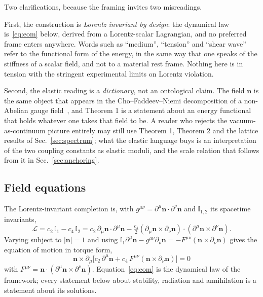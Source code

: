\documentclass[aps,prd,preprint,nofootinbib,longbibliography]{revtex4-2}
\newcommand{\nv}{\bm{n}}
\begin{document}
Two clarifications, because the framing invites two misreadings.

First, the construction is \emph{Lorentz invariant by design}: the dynamical law
is~\eqref{eq:eom} below, derived from a Lorentz-scalar Lagrangian, and no
preferred frame enters anywhere. Words such as ``medium'', ``tension'' and
``shear wave'' refer to the functional form of the energy, in the same way that
one speaks of the stiffness of a scalar field, and not to a material rest frame.
Nothing here is in tension with the stringent experimental limits on
Lorentz violation.

Second, the elastic reading is a \emph{dictionary}, not an ontological claim. The
field $\nv$ is the same object that appears in the Cho--Faddeev--Niemi
decomposition of a non-Abelian gauge field~\cite{cho1980,faddeev1999}, and
Theorem 1 is a statement about an energy functional that holds whatever one takes
that field to be. A reader who rejects the vacuum-as-continuum picture entirely
may still use Theorem 1, Theorem 2 and the lattice results of
Sec.~\ref{sec:spectrum}; what the elastic language buys is an interpretation of
the two coupling constants as elastic moduli, and the scale relation that follows
from it in Sec.~\ref{sec:anchoring}.

\subsection{Field equations}

The Lorentz-invariant completion is, with
$g^{\mu\nu}=\partial^\mu\nv\cdot\partial^\nu\nv$ and $\mathbb{I}_{1,2}$ its
spacetime invariants,
\begin{equation}
\mathcal{L}=c_2\,\mathbb{I}_1-c_4\,\mathbb{I}_2
=c_2\,\partial_\mu\nv\!\cdot\!\partial^\mu\nv
-\tfrac{c_4}{2}(\partial_\mu\nv\times\partial_\nu\nv)\!\cdot\!
(\partial^\mu\nv\times\partial^\nu\nv).
\end{equation}
Varying subject to $|\nv|=1$ and using
$\mathbb{I}_1\partial^\mu\nv-g^{\mu\nu}\partial_\nu\nv
=-F^{\mu\nu}(\nv\times\partial_\nu\nv)$ gives the equation of motion in torque
form,
\begin{equation}
\boxed{\;\nv\times\partial_\mu\Big[c_2\,\partial^\mu\nv
+c_4\,F^{\mu\nu}(\nv\times\partial_\nu\nv)\Big]=0\;}
\label{eq:eom}
\end{equation}
with $F^{\mu\nu}=\nv\cdot(\partial^\mu\nv\times\partial^\nu\nv)$.
Equation~\eqref{eq:eom} is the dynamical law of the framework; every statement
below about stability, radiation and annihilation is a statement about its
solutions.
\end{document}
